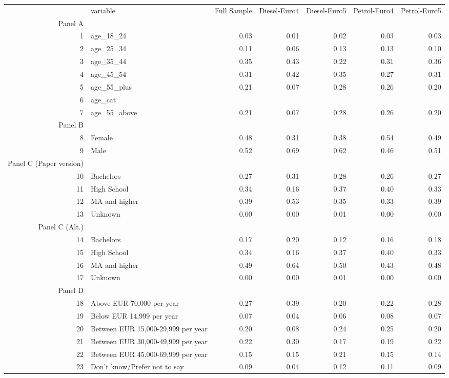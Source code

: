 \begin{table}[ht]
\centering
\begin{tabular}{rlrrrrr}
  \hline
 & variable & Full Sample & Diesel-Euro4 & Diesel-Euro5 & Petrol-Euro4 & Petrol-Euro5 \\ 
  Panel A & \multicolumn{5}{c}{} \\ 
 \hline
1 & age\_18\_24 & 0.03 & 0.01 & 0.02 & 0.03 & 0.03 \\ 
  2 & age\_25\_34 & 0.11 & 0.06 & 0.13 & 0.13 & 0.10 \\ 
  3 & age\_35\_44 & 0.35 & 0.43 & 0.22 & 0.31 & 0.36 \\ 
  4 & age\_45\_54 & 0.31 & 0.42 & 0.35 & 0.27 & 0.31 \\ 
  5 & age\_55\_plus & 0.21 & 0.07 & 0.28 & 0.26 & 0.20 \\ 
  6 & age\_cat &  &  &  &  &  \\ 
  7 & age\_55\_above & 0.21 & 0.07 & 0.28 & 0.26 & 0.20 \\ 
   Panel B & \multicolumn{5}{c}{} \\ 
8 & Female & 0.48 & 0.31 & 0.38 & 0.54 & 0.49 \\ 
  9 & Male & 0.52 & 0.69 & 0.62 & 0.46 & 0.51 \\ 
   Panel C (Paper version) & \multicolumn{5}{c}{} \\ 
10 & Bachelors & 0.27 & 0.31 & 0.28 & 0.26 & 0.27 \\ 
  11 & High School & 0.34 & 0.16 & 0.37 & 0.40 & 0.33 \\ 
  12 & MA and higher & 0.39 & 0.53 & 0.35 & 0.33 & 0.39 \\ 
  13 & Unknown & 0.00 & 0.00 & 0.01 & 0.00 & 0.00 \\ 
   Panel C (Alt.) & \multicolumn{5}{c}{} \\ 
14 & Bachelors & 0.17 & 0.20 & 0.12 & 0.16 & 0.18 \\ 
  15 & High School & 0.34 & 0.16 & 0.37 & 0.40 & 0.33 \\ 
  16 & MA and higher & 0.49 & 0.64 & 0.50 & 0.43 & 0.48 \\ 
  17 & Unknown & 0.00 & 0.00 & 0.01 & 0.00 & 0.00 \\ 
   Panel D & \multicolumn{5}{c}{} \\ 
18 & Above EUR 70,000 per year & 0.27 & 0.39 & 0.20 & 0.22 & 0.28 \\ 
  19 & Below EUR 14,999 per year & 0.07 & 0.04 & 0.06 & 0.08 & 0.07 \\ 
  20 & Between EUR 15,000-29,999 per year & 0.20 & 0.08 & 0.24 & 0.25 & 0.20 \\ 
  21 & Between EUR 30,000-49,999 per year & 0.22 & 0.30 & 0.17 & 0.19 & 0.22 \\ 
  22 & Between EUR 45,000-69,999 per year & 0.15 & 0.15 & 0.21 & 0.15 & 0.14 \\ 
  23 & Don't know/Prefer not to say & 0.09 & 0.04 & 0.12 & 0.11 & 0.09 \\ 
   \hline
\end{tabular}
\end{table}
